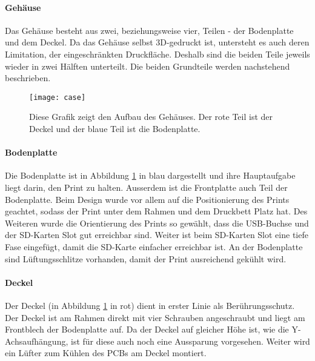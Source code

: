 \paragraph{Gehäuse}
Das Gehäuse besteht aus zwei, beziehungsweise vier, Teilen - der Bodenplatte und dem Deckel. Da das Gehäuse selbst 3D-gedruckt ist, untersteht es auch deren Limitation, der eingeschränkten Druckfläche. Deshalb sind die beiden Teile jeweils wieder in zwei Hälften unterteilt. Die beiden Grundteile werden nachstehend beschrieben.

\begin{figure}[h]
	\centering
	\texttt{[image: case]}
	\caption{Diese Grafik zeigt den Aufbau des Gehäuses. Der rote Teil ist der Deckel und der blaue Teil ist die Bodenplatte.}
	\label{pic:Case}
\end{figure}


\paragraph{Bodenplatte}
Die Bodenplatte ist in Abbildung \ref{pic:Case} in blau dargestellt und ihre Hauptaufgabe liegt darin, den Print zu halten. Ausserdem ist die Frontplatte auch Teil der Bodenplatte. Beim Design wurde vor allem auf die Positionierung des Prints geachtet, sodass der Print unter dem Rahmen und dem Druckbett Platz hat. Des Weiteren wurde die Orientierung des Prints so gewählt, dass die USB-Buchse und der SD-Karten Slot gut erreichbar sind. Weiter ist beim SD-Karten Slot eine tiefe Fase eingefügt, damit die SD-Karte einfacher erreichbar ist. An der Bodenplatte sind Lüftungsschlitze vorhanden, damit der Print ausreichend gekühlt wird.

\paragraph{Deckel}
Der Deckel (in Abbildung \ref{pic:Case} in rot) dient in erster Linie als Berührungsschutz. Der Deckel ist am Rahmen direkt mit vier Schrauben angeschraubt und liegt am Frontblech der Bodenplatte auf. Da der Deckel auf gleicher Höhe ist, wie die Y-Achsaufhängung, ist für diese auch noch eine Aussparung vorgesehen. Weiter wird ein Lüfter zum Kühlen des PCBs am Deckel montiert.

